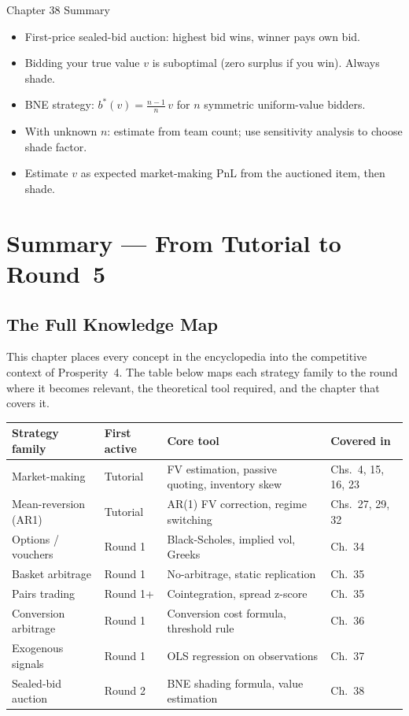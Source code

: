 \documentclass[12pt,a4paper,openany]{report}
\theoremstyle{definition}
\begin{document}
\begin{takeawaybox}{Chapter 38 Summary}
\begin{itemize}
  \item First-price sealed-bid auction: highest bid wins, winner pays own bid.
  \item Bidding your true value $v$ is suboptimal (zero surplus if you win). Always shade.
  \item BNE strategy: $b^*(v) = \frac{n-1}{n}\,v$ for $n$ symmetric uniform-value bidders.
  \item With unknown $n$: estimate from team count; use sensitivity analysis to choose shade factor.
  \item Estimate $v$ as expected market-making PnL from the auctioned item, then shade.
\end{itemize}
\end{takeawaybox}


\chapter{Summary — From Tutorial to Round~5}

\section{The Full Knowledge Map}

This chapter places every concept in the encyclopedia into the competitive context of Prosperity~4. The table below maps each strategy family to the round where it becomes relevant, the theoretical tool required, and the chapter that covers it.

\begin{center}
\renewcommand{\arraystretch}{1.5}
\begin{longtable}{p{3.5cm}p{2cm}p{4.5cm}p{2.5cm}}
\toprule
\textbf{Strategy family} & \textbf{First active} & \textbf{Core tool} & \textbf{Covered in} \\
\midrule
Market-making & Tutorial & FV estimation, passive quoting, inventory skew & Chs.\ 4, 15, 16, 23 \\
Mean-reversion (AR1) & Tutorial & AR(1) FV correction, regime switching & Chs.\ 27, 29, 32 \\
Options / vouchers & Round 1 & Black-Scholes, implied vol, Greeks & Ch.\ 34 \\
Basket arbitrage & Round 1 & No-arbitrage, static replication & Ch.\ 35 \\
Pairs trading & Round 1+ & Cointegration, spread z-score & Ch.\ 35 \\
Conversion arbitrage & Round 1 & Conversion cost formula, threshold rule & Ch.\ 36 \\
Exogenous signals & Round 1 & OLS regression on observations & Ch.\ 37 \\
Sealed-bid auction & Round 2 & BNE shading formula, value estimation & Ch.\ 38 \\
\bottomrule
\end{longtable}
\end{center}
\end{document}
